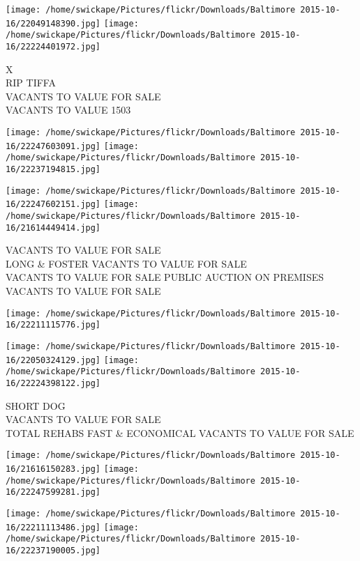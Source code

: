 \documentclass[10pt,letterpaper]{article}
\begin{document}
\texttt{[image: /home/swickape/Pictures/flickr/Downloads/Baltimore 2015-10-16/22049148390.jpg]}
\texttt{[image: /home/swickape/Pictures/flickr/Downloads/Baltimore 2015-10-16/22224401972.jpg]}

X\\
RIP TIFFA\\
VACANTS TO VALUE FOR SALE\\
VACANTS TO VALUE 1503\\
\pagebreak

\texttt{[image: /home/swickape/Pictures/flickr/Downloads/Baltimore 2015-10-16/22247603091.jpg]}
\texttt{[image: /home/swickape/Pictures/flickr/Downloads/Baltimore 2015-10-16/22237194815.jpg]}

\texttt{[image: /home/swickape/Pictures/flickr/Downloads/Baltimore 2015-10-16/22247602151.jpg]}
\texttt{[image: /home/swickape/Pictures/flickr/Downloads/Baltimore 2015-10-16/21614449414.jpg]}

VACANTS TO VALUE FOR SALE\\
LONG \& FOSTER VACANTS TO VALUE FOR SALE\\
VACANTS TO VALUE FOR SALE PUBLIC AUCTION ON PREMISES\\
VACANTS TO VALUE FOR SALE\\
\pagebreak

\texttt{[image: /home/swickape/Pictures/flickr/Downloads/Baltimore 2015-10-16/22211115776.jpg]}

\vspace{0.25in}
\texttt{[image: /home/swickape/Pictures/flickr/Downloads/Baltimore 2015-10-16/22050324129.jpg]}
\texttt{[image: /home/swickape/Pictures/flickr/Downloads/Baltimore 2015-10-16/22224398122.jpg]}

SHORT DOG\\
VACANTS TO VALUE FOR SALE\\
TOTAL REHABS FAST \& ECONOMICAL VACANTS TO VALUE FOR SALE\\
\pagebreak

\texttt{[image: /home/swickape/Pictures/flickr/Downloads/Baltimore 2015-10-16/21616150283.jpg]}
\texttt{[image: /home/swickape/Pictures/flickr/Downloads/Baltimore 2015-10-16/22247599281.jpg]}

\texttt{[image: /home/swickape/Pictures/flickr/Downloads/Baltimore 2015-10-16/22211113486.jpg]}
\texttt{[image: /home/swickape/Pictures/flickr/Downloads/Baltimore 2015-10-16/22237190005.jpg]}
\end{document}
